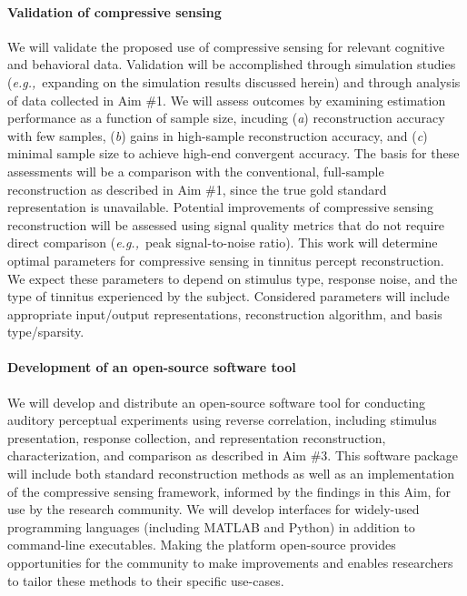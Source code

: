 \documentclass[11pt, notitlepage]{article} %
\def\eg{{\emph{e.g.,}}~}
\begin{document}
\paragraph{Validation of compressive sensing}

We will validate the proposed use of compressive sensing for relevant
cognitive and behavioral data.
Validation will be accomplished through simulation studies
(\eg expanding on the simulation results discussed herein)
and through analysis of data collected in Aim \#1.
We will assess outcomes by examining estimation performance
as a function of sample size,
incuding
(\emph{a}) reconstruction accuracy with few samples,
(\emph{b}) gains in high-sample reconstruction accuracy, and
(\emph{c}) minimal sample size to achieve high-end convergent accuracy.
The basis for these assessments will be a comparison
with the conventional, full-sample reconstruction
as described in Aim \#1,
since the true gold standard representation is unavailable.
Potential improvements of compressive sensing reconstruction
will be assessed using signal quality metrics that do not require direct comparison
(\eg peak signal-to-noise ratio).
This work will determine optimal parameters for compressive sensing
in tinnitus percept reconstruction.
We expect these parameters to depend on stimulus type, response noise,
and the type of tinnitus experienced by the subject.
Considered parameters will include appropriate input/output representations,
reconstruction algorithm, and basis type/sparsity.

\paragraph{Development of an open-source software tool}

We will develop and distribute an open-source software tool for conducting
auditory perceptual experiments using reverse correlation,
including stimulus presentation, response collection,
and representation reconstruction, characterization, and comparison
as described in Aim \#3.
This software package will include both standard reconstruction methods
as well as an implementation of the compressive sensing framework,
informed by the findings in this Aim, for use by the research community.
We will develop interfaces for widely-used programming languages
(including MATLAB and Python) in addition to command-line executables.
Making the platform open-source provides opportunities for the community
to make improvements and enables researchers to tailor these methods to their specific use-cases.
\end{document}

